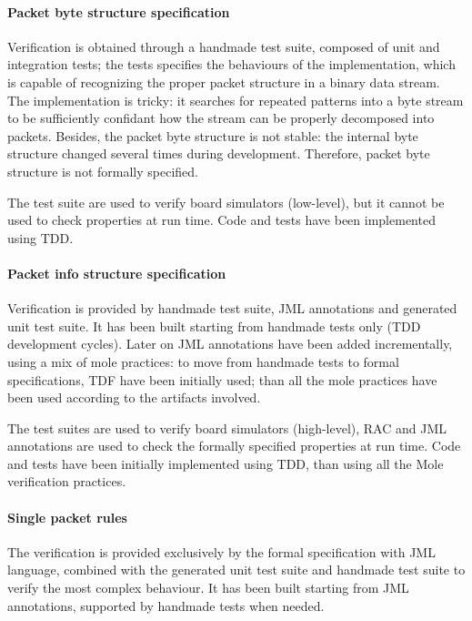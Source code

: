 \documentclass[english]{lni}
\begin{document}
\paragraph*{Packet byte structure specification}

Verification is obtained through a handmade test suite, composed of unit and integration tests; the tests specifies the behaviours of the implementation, which is capable of recognizing the proper packet structure in a binary data stream. 
The implementation is tricky: it searches for repeated patterns into a byte stream to be sufficiently confidant how the stream can be properly decomposed into packets.
Besides, the packet byte structure is not stable: the internal byte structure changed several times during development.
Therefore, packet byte structure is not formally specified.

The test suite are used to verify board simulators (low-level), but it cannot be used to check properties at run time.
Code and tests have been implemented using TDD.

\paragraph*{Packet info structure specification}

Verification is provided by handmade test suite, JML annotations and generated unit test suite. 
It has been built starting from handmade tests only (TDD development cycles).
Later on JML annotations have been added incrementally, using a mix of mole practices: to move from handmade tests to formal specifications, TDF have been initially used; than all the mole practices have been used according to the artifacts involved.

The test suites are used to verify board simulators (high-level), RAC and JML annotations are used to check the formally specified properties at run time.
Code and tests have been initially implemented using TDD, than using all the Mole verification practices.

\paragraph*{Single packet rules}

The verification is provided exclusively by the formal specification with JML language, combined with the generated unit test suite and handmade test suite to verify the most complex behaviour.
It has been built starting from JML annotations, supported by handmade tests when needed.
\end{document}
